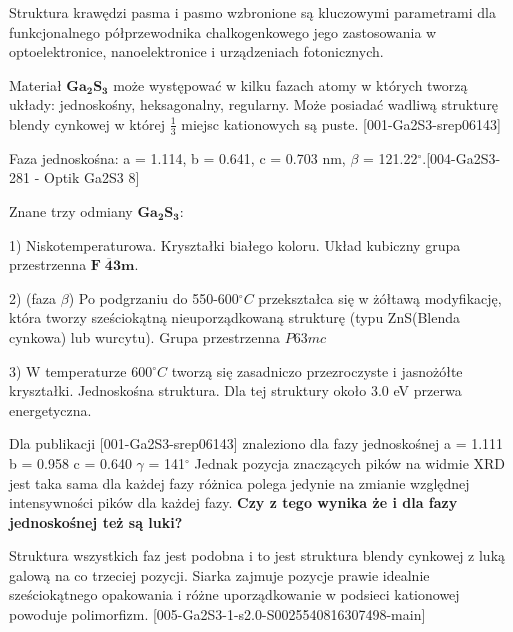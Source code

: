 Struktura krawędzi pasma i pasmo wzbronione są kluczowymi parametrami dla funkcjonalnego półprzewodnika chalkogenkowego
jego zastosowania w optoelektronice, nanoelektronice i urządzeniach fotonicznych.

Materiał $\mathbf{Ga_{2}S_{3}}$ może występować w kilku fazach atomy w których tworzą układy: jednoskośny, heksagonalny, regularny. Może posiadać wadliwą strukturę blendy cynkowej w której $\frac{1}{3}$ miejsc kationowych są puste.
[001-Ga2S3-srep06143]

Faza jednoskośna: a = 1.114, b = 0.641, c = 0.703 nm, $\beta$ = 121.22$^\circ$.[004-Ga2S3-281 - Optik Ga2S3 8]

Znane trzy odmiany $\mathbf{Ga_{2}S_{3}}$:

1) Niskotemperaturowa. Kryształki białego koloru. Układ kubiczny grupa przestrzenna $\mathbf{F\;\overline{4}3m}$.

2) (faza $\beta$) Po podgrzaniu do 550-600$^\circ C$ przekształca się w żółtawą modyfikację, która
tworzy sześciokątną nieuporządkowaną strukturę (typu ZnS(Blenda cynkowa) lub wurcytu). Grupa przestrzenna $P63mc$

3) W temperaturze 600$^\circ C$ tworzą się zasadniczo przezroczyste i jasnożółte kryształki. Jednoskośna struktura. Dla tej struktury około 3.0 eV przerwa energetyczna.

Dla publikacji [001-Ga2S3-srep06143] znaleziono dla fazy jednoskośnej
a = 1.111 b = 0.958 c = 0.640 $\gamma$ = 141$^\circ$ Jednak pozycja znaczących pików na widmie XRD jest taka sama dla każdej fazy
różnica polega jedynie na zmianie względnej intensywności pików dla każdej fazy.
\textbf{Czy z tego wynika że i dla fazy jednoskośnej też są luki?}

Struktura wszystkich faz jest podobna i to jest struktura blendy cynkowej z luką galową na co trzeciej pozycji. Siarka zajmuje
pozycje prawie idealnie sześciokątnego opakowania i różne
uporządkowanie w podsieci kationowej powoduje polimorfizm.	 
[005-Ga2S3-1-s2.0-S0025540816307498-main]

